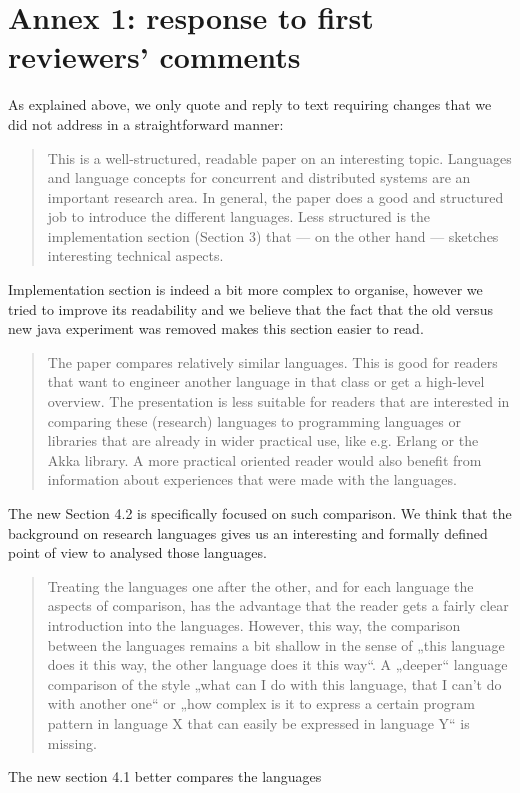 \documentclass{article}
\begin{document}
\newpage
\section*{Annex 1: response to first reviewers' comments}
As explained above, we only quote and reply to text requiring changes that we did not 
address in a straightforward manner:

\begin{quote}
This is a well-structured, readable paper on an interesting topic. Languages and language 
concepts for concurrent and distributed systems are an important research area. In 
general, the paper does a good and structured job to introduce the different languages. 
Less structured is the implementation section (Section 3) that — on the other hand — 
sketches interesting technical aspects.
\end{quote}
Implementation section is indeed a bit more complex to organise, however we tried to 
improve its readability and we believe that the fact that the old versus new java 
experiment was removed makes this section easier to read.

\begin{quote}
The paper compares relatively similar languages. This is good for readers that want to 
engineer another language in that class or get a high-level overview. The presentation is 
less suitable for readers that are interested in comparing these (research) languages to 
programming languages or libraries that are already in wider practical use, like e.g. 
Erlang or the Akka library. A more practical oriented reader would also benefit from 
information about experiences that were made with the languages.
\end{quote}
The new Section 4.2 is specifically focused on such comparison. We think that the 
background on research languages gives us an interesting and formally defined point of 
view to analysed those languages.

\begin{quote}
Treating the languages one after the other, and for each language the aspects of 
comparison, has the advantage that the reader gets a fairly clear introduction into the 
languages. However, this way, the comparison between the languages remains a bit shallow 
in the sense of „this language does it this way, the other language does it this way“. A 
„deeper“ language comparison of the style „what can I do with this language, that I can’t 
do with another one“ or „how complex is it to express a certain program pattern in 
language X that can easily be expressed in language Y“ is missing. 
\end{quote}
The new section 4.1 better compares the languages
\end{document}
